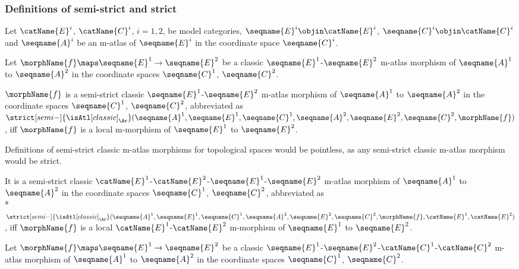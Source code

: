 \documentclass{article}
\begin{document}
\subsubsection{Definitions of semi-strict and strict}
\begin{definition}
\label{def:M-ATLcmorphsemi}
Let $\catName{E}^i$, $\catName{C}^i$, $i=1,2$, be model categories,
$\seqname{E}^i \objin \catName{E}^i$,
$\seqname{C}^i \objin \catName{C}^i$ and $\seqname{A}^i$ be an m-atlas
of $\seqname{E}^i$ in the coordinate space $\seqname{C}^i$.

Let $\morphName{f} \maps \seqname{E}^1 \to \seqname{E}^2$ be a classic
$\seqname{E}^1$-$\seqname{E}^2$ m-atlas morphism of
$\seqname{A}^1$ to $\seqname{A}^2$ in the coordinate spaces
$\seqname{C}^1$, $\seqname{C}^2$.

$\morphName{f}$ is a semi-strict classic $\seqname{E}^1$-$\seqname{E}^2$
m-atlas morphism of $\seqname{A}^1$ to $\seqname{A}^2$ in the
coordinate spaces $\seqname{C}^1$, $\seqname{C}^2$, abbreviated as
$
  \strict[semi-]{\isAtl[classic]_\Ar}
  (
    \seqname{A}^1,
    \seqname{E}^1,
    \seqname{C}^1,
    \seqname{A}^2,
    \seqname{E}^2,
    \seqname{C}^2,
    \morphName{f}
  )
$,
iff $\morphName{f}$ is a local m-morphism of $\seqname{E}^1$ to
$\seqname{E}^2$.

\begin{remark}
Definitions of semi-strict classic m-atlas morphisms for
topological spaces would be pointless, as any semi-strict classic
m-atlas morphism would be strict.
\end{remark}

It is a semi-strict classic
$\catName{E}^1$-$\catName{E}^2$-$\seqname{E}^1$-$\seqname{E}^2$ m-atlas
morphism of $\seqname{A}^1$ to $\seqname{A}^2$ in the coordinate
spaces $\seqname{C}^1$, $\seqname{C}^2$, abbreviated as \\*
$
  \strict[semi-]{\isAtl[classic]_\Ar}
  (
    \seqname{A}^1,
    \seqname{E}^1,
    \seqname{C}^1,
    \seqname{A}^2,
    \seqname{E}^2,
    \seqname{C}^2,
    \morphName{f},
    \catName{E}^1,
    \catName{E}^2
  )
$,
iff $\morphName{f}$ is a local $\catName{E}^1$-$\catName{E}^2$
m-morphism of $\seqname{E}^1$ to $\seqname{E}^2$.

Let $\morphName{f} \maps \seqname{E}^1 \to \seqname{E}^2$ be a classic
$\seqname{E}^1$-$\seqname{E}^2$-$\catName{C}^1$-$\catName{C}^2$ m-atlas
morphism of $\seqname{A}^1$ to $\seqname{A}^2$ in the coordinate
spaces $\seqname{C}^1$, $\seqname{C}^2$.


\end{definition}
\end{document}
